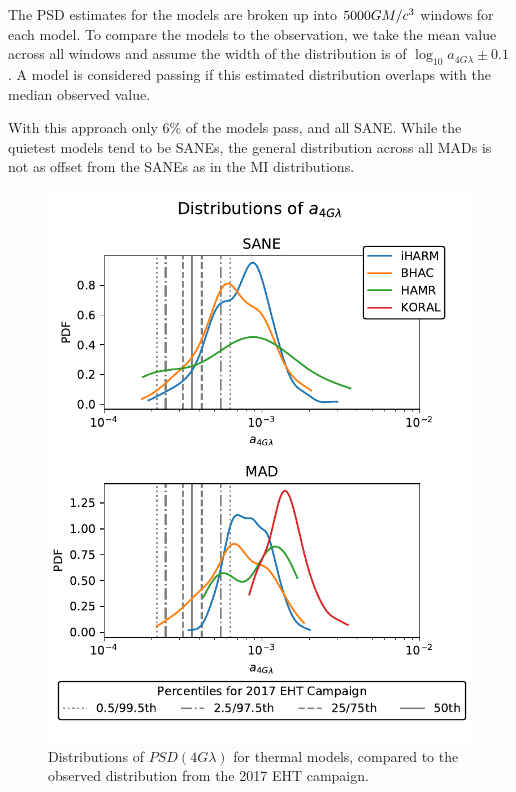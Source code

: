 The PSD estimates for the models are broken up into $5000GM/c^3$ windows for each model. To compare the models to the observation, we take the mean value across all windows and assume the width of the distribution is of $\log_{10} a_{4G\lambda} \pm 0.1$. A model is considered passing if this estimated distribution overlaps with the median observed value.  

With this approach only 6\% of the models pass, and all SANE. While the quietest models tend to be SANEs, the general distribution across all MADs is not as offset from the SANEs as in the MI distributions. 

\begin{figure}
  \centering
    \includegraphics[width=\columnwidth]{./figures/va_dist.pdf}
  \caption{Distributions of $PSD(4G\lambda)$ for thermal models, compared to the observed distribution from the 2017 EHT campaign.
  }
  \label{fig:cmp_VLBI_var}
\end{figure}


